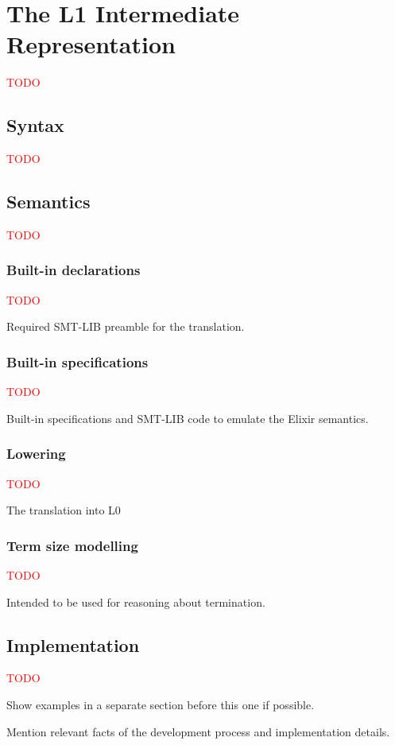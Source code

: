 \chapter{The L1 Intermediate Representation}
\label{cap:intermediateRepresentation}

\textcolor{red}{TODO}

\section{Syntax}

\textcolor{red}{TODO}

\section{Semantics}

\textcolor{red}{TODO}

\subsection{Built-in declarations}

\textcolor{red}{TODO}

Required SMT-LIB preamble for the translation.

\subsection{Built-in specifications}

\textcolor{red}{TODO}

Built-in specifications and SMT-LIB code to emulate the 
Elixir semantics.

\subsection{Lowering}

\textcolor{red}{TODO}

The translation into L0

\subsection{Term size modelling}

\textcolor{red}{TODO}

Intended to be used for reasoning about termination.

\section{Implementation}

\textcolor{red}{TODO}

Show examples in a separate section before this one if possible.

Mention relevant facts of the development process and implementation details.
